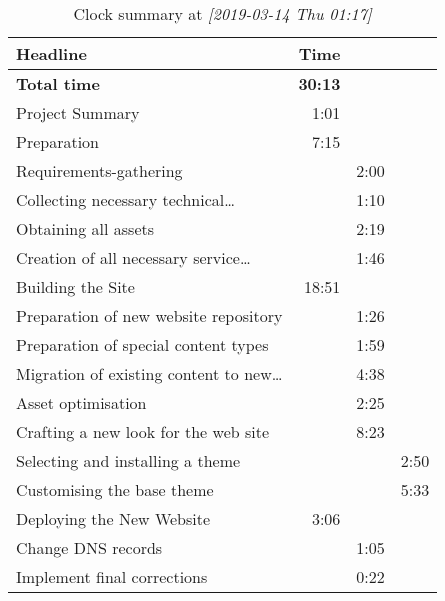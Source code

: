 \documentclass{article}
\begin{document}
\begin{table}[htbp]
\caption{Clock summary at \textit{[2019-03-14 Thu 01:17]}}
\centering
\begin{tabular}{lrrl}
Headline & Time &  & \\
\hline
\textbf{Total time} & \textbf{30:13} &  & \\
\hline
Project Summary & 1:01 &  & \\
Preparation & 7:15 &  & \\
\hspace*{1.0em}Requirements-gathering &  & 2:00 & \\
\hspace*{1.0em}Collecting necessary technical\ldots{} &  & 1:10 & \\
\hspace*{1.0em}Obtaining all assets &  & 2:19 & \\
\hspace*{1.0em}Creation of all necessary service\ldots{} &  & 1:46 & \\
Building the Site & 18:51 &  & \\
\hspace*{1.0em}Preparation of new website repository &  & 1:26 & \\
\hspace*{1.0em}Preparation of special content types &  & 1:59 & \\
\hspace*{1.0em}Migration of existing content to new\ldots{} &  & 4:38 & \\
\hspace*{1.0em}Asset optimisation &  & 2:25 & \\
\hspace*{1.0em}Crafting a new look for the web site &  & 8:23 & \\
\hspace*{2.0em}Selecting and installing a theme &  &  & 2:50\\
\hspace*{2.0em}Customising the base theme &  &  & 5:33\\
Deploying the New Website & 3:06 &  & \\
\hspace*{1.0em}Change DNS records &  & 1:05 & \\
\hspace*{1.0em}Implement final corrections &  & 0:22 & \\
\end{tabular}
\end{table}
\end{document}
